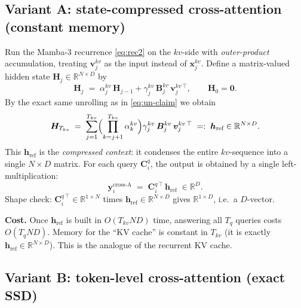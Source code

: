 \documentclass[11pt,a4paper]{article}
\begin{document}
\subsection{Variant A: state-compressed cross-attention (constant memory)}
\label{sec:crossA}

Run the Mamba-3 recurrence \eqref{eq:rec2} on the $kv$-side with
\emph{outer-product} accumulation, treating $\bm{v}_j^{kv}$ as the
input instead of $\bm{x}_j^{kv}$. Define a matrix-valued hidden state
$\bm{H}_j \in \mathbb{R}^{N\times D}$ by
\begin{equation}\label{eq:Hrec}
  \bm{H}_j \;=\; \alpha_j^{kv}\,\bm{H}_{j-1}
                + \gamma_j^{kv}\,\bm{B}_j^{kv}\,\bm{v}_j^{kv\,\top},
  \qquad \bm{H}_0 = \bm{0}.
\end{equation}
By the exact same unrolling as in \eqref{eq:un-claim} we obtain
\begin{equation}\label{eq:Hclose}
  \bm{H}_{T_{kv}} \;=\; \sum_{j=1}^{T_{kv}}
      \Bigl(\prod_{k=j+1}^{T_{kv}}\alpha_k^{kv}\Bigr)
      \gamma_j^{kv}\,\bm{B}_j^{kv}\,\bm{v}_j^{kv\,\top}
  \;=:\; \bm{h}_{\text{ref}} \in \mathbb{R}^{N\times D}.
\end{equation}
This $\bm{h}_{\text{ref}}$ is the \emph{compressed context}: it
condenses the entire $kv$-sequence into a single $N\times D$ matrix.
For each query $\bm{C}_i^q$, the output is obtained by a single
left-multiplication:
\begin{equation}\label{eq:crossA-out}
  \boxed{\;\bm{y}_i^{\text{cross-A}} \;=\; \bm{C}_i^{q\,\top}\,\bm{h}_{\text{ref}} \;\in \mathbb{R}^{D}.\;}
\end{equation}
Shape check: $\bm{C}_i^{q\,\top}\in\mathbb{R}^{1\times N}$ times
$\bm{h}_{\text{ref}}\in\mathbb{R}^{N\times D}$ gives
$\mathbb{R}^{1\times D}$, i.e.\ a $D$-vector.

\textbf{Cost.} Once $\bm{h}_{\text{ref}}$ is built in $O(T_{kv}ND)$
time, answering all $T_q$ queries costs $O(T_q ND)$. Memory for the
``KV cache'' is constant in $T_{kv}$ (it is exactly
$\bm{h}_{\text{ref}}\in\mathbb{R}^{N\times D}$). This is the
analogue of the recurrent KV cache.

\subsection{Variant B: token-level cross-attention (exact SSD)}
\label{sec:crossB}
\end{document}
